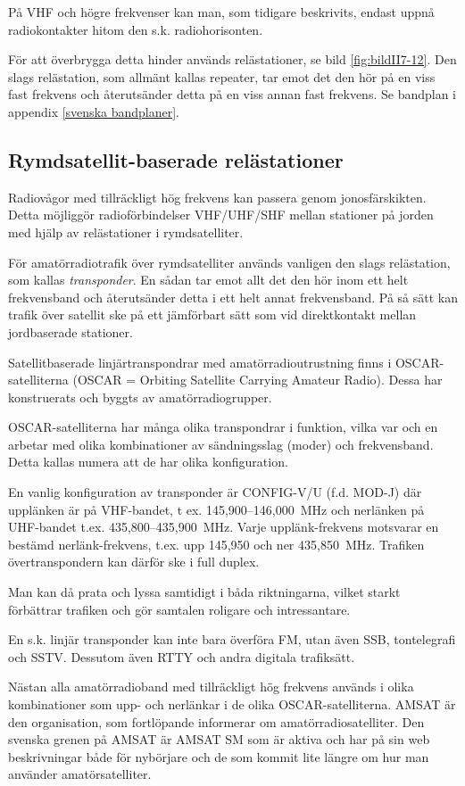 På VHF och högre frekvenser kan man, som tidigare beskrivits, endast
uppnå radiokontakter hitom den s.k. radiohorisonten.

För att överbrygga detta hinder används relästationer, se bild
\ref{fig:bildII7-12}. Den slags
relästation, som allmänt kallas repeater, tar emot det den hör på en
viss fast frekvens och återutsänder detta på en viss annan fast
frekvens. Se bandplan i appendix \ref{svenska bandplaner}.

\subsection{Rymdsatellit-baserade relästationer}

Radiovågor med tillräckligt hög frekvens kan passera genom
jonosfärskikten. Detta möjliggör radioförbindelser VHF/UHF/SHF mellan
stationer på jorden med hjälp av relästationer i rymdsatelliter.

För amatörradiotrafik över rymdsatelliter används vanligen den slags
relästation, som kallas \emph{transponder}. En sådan tar emot allt det
den hör inom ett helt frekvensband och återutsänder detta i ett helt
annat frekvensband. På så sätt kan trafik över satellit ske på ett
jämförbart sätt som vid direktkontakt mellan jordbaserade stationer.

Satellitbaserade linjärtranspondrar med amatörradioutrustning finns i
OSCAR-satelliterna (OSCAR = Orbiting Satellite Carrying Amateur
Radio). Dessa har konstruerats och byggts av amatörradiogrupper.

OSCAR-satelliterna har många olika transpondrar i funktion, vilka var
och en arbetar med olika kombinationer av sändningsslag (moder) och
frekvensband. Detta kallas numera att de har olika konfiguration.

En vanlig konfiguration av transponder är CONFIG-V/U (f.d. MOD-J) där
upplänken är på VHF-bandet, t ex. 145,900--146,000~MHz och nerlänken på
UHF-bandet t.ex.  435,800--435,900~MHz. Varje upplänk-frekvens
motsvarar en bestämd nerlänk-frekvens, t.ex. upp 145,950 och ner
435,850~MHz. Trafiken övertranspondern kan därför ske i full duplex.

Man kan då prata och lyssa samtidigt i båda riktningarna, vilket
starkt förbättrar trafiken och gör samtalen roligare och
intressantare.

En s.k. linjär transponder kan inte bara överföra FM, utan även SSB,
tontelegrafi och SSTV. Dessutom även RTTY och andra digitala
trafiksätt.

Nästan alla amatörradioband med tillräckligt hög frekvens används i
olika kombinationer som upp- och nerlänkar i de olika
OSCAR-satelliterna.
AMSAT är den organisation, som fortlöpande informerar om amatörradiosatelliter.
Den svenska grenen på AMSAT är AMSAT SM som är aktiva och har på sin web
beskrivningar både för nybörjare och de som kommit lite längre om hur man
använder amatörsatelliter.

